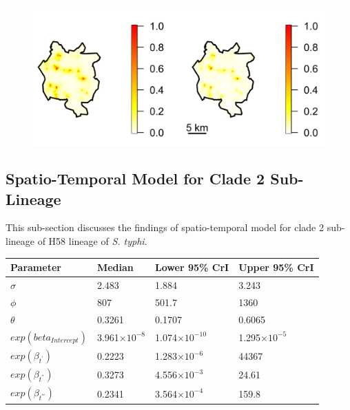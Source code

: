 \begin{figure}[H]
    \begin{center}
        \includegraphics[scale=0.8]{Exceedance Probabilities - Major 0.png}
    \end{center}
     \label{fig:exceedance-plot-zero-cases}
\end{figure}

\subsection{Spatio-Temporal Model for Clade 2 Sub-Lineage}

This sub-section discusses the findings of spatio-temporal model for clade 2 sub-lineage of H58 lineage of \textit{S. typhi}.

\hspace*{0.2pt}
\addtocounter{table}{-1}
\begin{spacing}{0.9}
      \label{tab:lgcp-model-two-cases}
    \begin{longtable}{p{1.3in}p{1.3in}p{1.3in}p{1.3in}}

        \toprule
        Parameter               & Median               & Lower 95\% CrI        & Upper 95\% CrI       \\ \midrule
        $\sigma$                & 2.483                & 1.884                 & 3.243                \\
        $\phi$                  & 807                  & 501.7                 & 1360                 \\
        $\theta$                & 0.3261               & 0.1707                & 0.6065               \\
        $exp(beta_{Intercept})$ & 3.961$\times10^{-8}$ & 1.074$\times10^{-10}$ & 1.295$\times10^{-5}$ \\
        $exp(\beta_{t^{'}})$    & 0.2223               & 1.283$\times10^{-6}$  & 44367                \\
        $exp(\beta_{t^{''}})$   & 0.3273               & 4.556$\times10^{-3}$  & 24.61                \\
        $exp(\beta_{t^{'''}})$  & 0.2341               & 3.564$\times10^{-4}$  & 159.8                \\
        \bottomrule

    \end{longtable}
\end{spacing}

